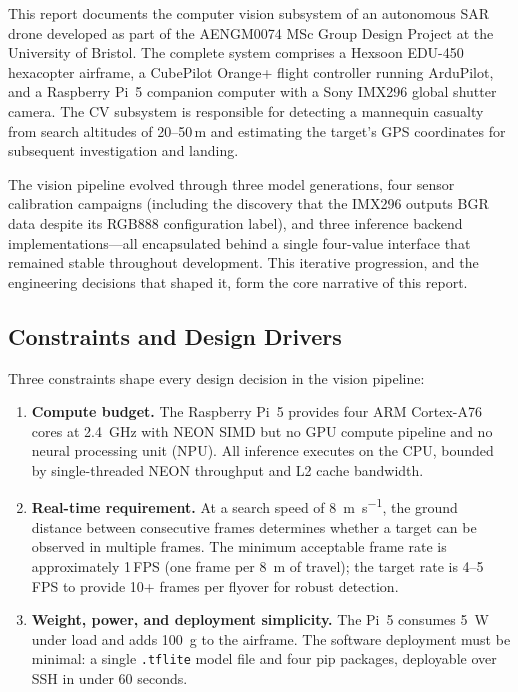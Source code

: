 \documentclass[10pt,a4paper]{article}
\begin{document}
This report documents the computer vision subsystem of an autonomous SAR drone developed as part of the AENGM0074 MSc Group Design Project at the University of Bristol. The complete system comprises a Hexsoon EDU-450 hexacopter airframe, a CubePilot Orange+ flight controller running ArduPilot, and a Raspberry Pi~5 companion computer with a Sony IMX296 global shutter camera. The CV subsystem is responsible for detecting a mannequin casualty from search altitudes of 20--50\,m and estimating the target's GPS coordinates for subsequent investigation and landing.

The vision pipeline evolved through three model generations, four sensor calibration campaigns (including the discovery that the IMX296 outputs BGR data despite its RGB888 configuration label), and three inference backend implementations---all encapsulated behind a single four-value interface that remained stable throughout development. This iterative progression, and the engineering decisions that shaped it, form the core narrative of this report.

\subsection{Constraints and Design Drivers}

Three constraints shape every design decision in the vision pipeline:

\begin{enumerate}
    \item \textbf{Compute budget.} The Raspberry Pi~5 provides four ARM Cortex-A76 cores at \SI{2.4}{\giga\hertz} with NEON SIMD but no GPU compute pipeline and no neural processing unit (NPU). All inference executes on the CPU, bounded by single-threaded NEON throughput and L2 cache bandwidth.
    \item \textbf{Real-time requirement.} At a search speed of \SI{8}{\metre\per\second}, the ground distance between consecutive frames determines whether a target can be observed in multiple frames. The minimum acceptable frame rate is approximately 1\,FPS (one frame per \SI{8}{\metre} of travel); the target rate is 4--5\,FPS to provide 10+ frames per flyover for robust detection.
    \item \textbf{Weight, power, and deployment simplicity.} The Pi~5 consumes \SI{5}{\watt} under load and adds \SI{100}{\gram} to the airframe. The software deployment must be minimal: a single \texttt{.tflite} model file and four pip packages, deployable over SSH in under 60 seconds.
\end{enumerate}
\end{document}
